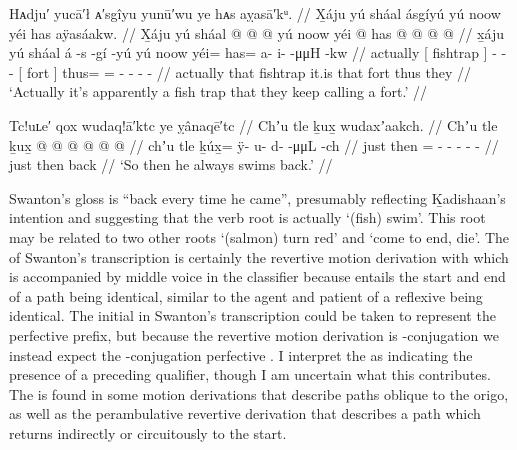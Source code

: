 \ex\label{ex:100-110-apparently-fish-trap}%
%
\begingl
	\glpreamble	Hᴀdju′ yucā′ł ᴀ′sgîyu yunū′wu ye hᴀs aỵasā′kᵘ. //
	\glpreamble	X̱áju yú sháal ásgíyú yú noow yéi has aÿasáakw. //
	\gla	X̱áju 
		{} yú sháal {}  @ {} @ {} @ {} 
		{} yú noow {}
		yéi @ has @  @ {} @ {} @ {} //
	\glb	x̱áju 
		{} yú sháal {} á -s -gí -yú 
		{} yú noow {}
		yéi= has= a- i-  -μμH -kw //
	\glc	actually 	
		{}[  fishtrap {}]  - - -
		{}[  fort {}]
		thus= = - -  - - //
	\gld	actually
		{} that fishtrap {} it.is \· {} {}
		{} that fort {}
		thus they  {} {} {} //
	\glft	‘Actually it’s apparently a fish trap that they keep calling a fort.’
		//
\endgl
\xe

\ex\label{ex:100-111-swam-back}%
%
\begingl
	\glpreamble	Tc!uʟe′ qox wudaq!ā′ktc ye ỵânaqē′tc //
	\glpreamble	Chʼu tle ḵux̱ wudaxʼaakch. //
	\gla	Chʼu tle ḵux̱ @  @ {} @ {} @ {} @ {} @ {} //
	\glb	chʼu tle ḵúx̱= ÿ- u- d-  -μμL -ch //
	\glc	just then = - - -  - - //
	\gld	just then back  {} {} {} {} {} //
	\glft	‘So then he always swims back.’
		//
\endgl
\xe

Swanton’s gloss is “back every time he came”, presumably reflecting Ḵadishaan’s intention and suggesting that the verb root is actually  ‘(fish) swim’.
This root may be related to two other roots  ‘(salmon) turn red’ and  ‘come to end, die’.
The  of Swanton’s transcription is certainly the revertive motion derivation with  which is accompanied by middle voice  in the classifier because  entails the start and end of a path being identical, similar to the agent and patient of a reflexive being identical.
The initial  in Swanton’s transcription could be taken to represent the  perfective prefix, but because the revertive motion derivation is -conjugation we instead expect the -conjugation perfective  .
I interpret the  as indicating the presence of a preceding  qualifier, though I am uncertain what this contributes.
The  is found in some motion derivations that describe paths oblique to the origo, as well as the perambulative revertive derivation  that describes a path which returns indirectly or circuitously to the start.

